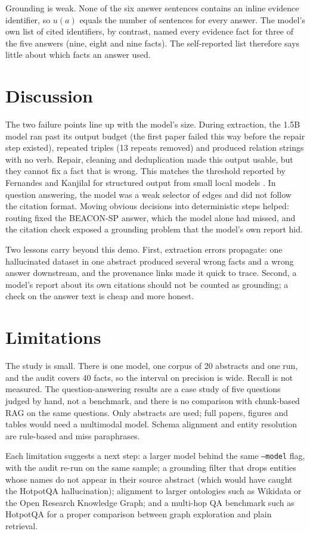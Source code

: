 \documentclass[11pt]{article}
\newcommand{\code}[1]{\texttt{#1}}
\begin{document}
Grounding is weak. None of the six answer sentences contains an inline evidence identifier, so $u(a)$ equals the number of sentences for every answer. The model's own list of cited identifiers, by contrast, named every evidence fact for three of the five answers (nine, eight and nine facts). The self-reported list therefore says little about which facts an answer used.

\section{Discussion}
The two failure points line up with the model's size. During extraction, the 1.5B model ran past its output budget (the first paper failed this way before the repair step existed), repeated triples (13 repeats removed) and produced relation strings with no verb. Repair, cleaning and deduplication made this output usable, but they cannot fix a fact that is wrong. This matches the threshold reported by Fernandes and Kanjilal for structured output from small local models \cite{fernandes2026consumer}. In question answering, the model was a weak selector of edges and did not follow the citation format. Moving obvious decisions into deterministic steps helped: routing fixed the BEACON-SP answer, which the model alone had missed, and the citation check exposed a grounding problem that the model's own report hid.

Two lessons carry beyond this demo. First, extraction errors propagate: one hallucinated dataset in one abstract produced several wrong facts and a wrong answer downstream, and the provenance links made it quick to trace. Second, a model's report about its own citations should not be counted as grounding; a check on the answer text is cheap and more honest.

\section{Limitations}
The study is small. There is one model, one corpus of 20 abstracts and one run, and the audit covers 40 facts, so the interval on precision is wide. Recall is not measured. The question-answering results are a case study of five questions judged by hand, not a benchmark, and there is no comparison with chunk-based RAG on the same questions. Only abstracts are used; full papers, figures and tables would need a multimodal model. Schema alignment and entity resolution are rule-based and miss paraphrases.

Each limitation suggests a next step: a larger model behind the same \code{--model} flag, with the audit re-run on the same sample; a grounding filter that drops entities whose names do not appear in their source abstract (which would have caught the HotpotQA hallucination); alignment to larger ontologies such as Wikidata or the Open Research Knowledge Graph; and a multi-hop QA benchmark such as HotpotQA \cite{yang2018hotpotqa} for a proper comparison between graph exploration and plain retrieval.
\end{document}
